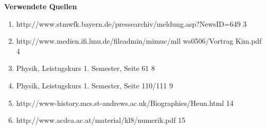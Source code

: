\vspace{1 cm}

\begin{Large}\textbf{Verwendete Quellen}\end{Large}

\begin{enumerate}
	\item  \hspace{0.5 cm}http://www.stmwfk.bayern.de/pressearchiv/meldung.asp?NewsID=649 \hfill 3
	\item  \hspace{0.5 cm}http://www.medien.ifi.lmu.de/fileadmin/mimuc/mll ws0506/Vortrag Kim.pdf \hfill 4
	\item  \hspace{0.5 cm}Physik, Leistugskurs 1. Semester, Seite 61  \hfill 8
	\item  \hspace{0.5 cm}Physik, Leistugskurs 1. Semester, Seite 110/111 \hfill 9
	\item  \hspace{0.5 cm}http://www-history.mcs.st-andrews.ac.uk/Biographies/Heun.html \hfill 14
	\item  \hspace{0.5 cm}http://www.acdca.ac.at/material/kl8/numerik.pdf \hfill 15
\end{enumerate}